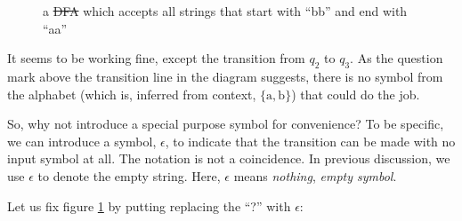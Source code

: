 \documentclass[11pt]{article}
\begin{document}
\begin{figure}[ht]
    \centering
    \caption{a \sout{DFA} which accepts all strings that start with ``bb'' and end with ``aa''}
    \label{fig:fig6}
\end{figure}

It seems to be working fine, except the transition from $q_2$ to $q_3$.
As the question mark above the transition line in the diagram suggests,
there is no symbol from the alphabet (which is, inferred from context,
$\{\mathrm{a},\mathrm{b}\}$) that could do the job.

So, why not introduce a special purpose symbol for convenience? To be
specific, we can introduce a symbol, $\epsilon$, to indicate that the
transition can be made with no input symbol at all. The notation is
not a coincidence. In previous discussion, we use $\epsilon$ to denote
the empty string. Here, $\epsilon$ means \emph{nothing},
\emph{empty symbol}.

Let us fix figure \ref{fig:fig6} by putting replacing the ``?'' with
$\epsilon$:
\end{document}
